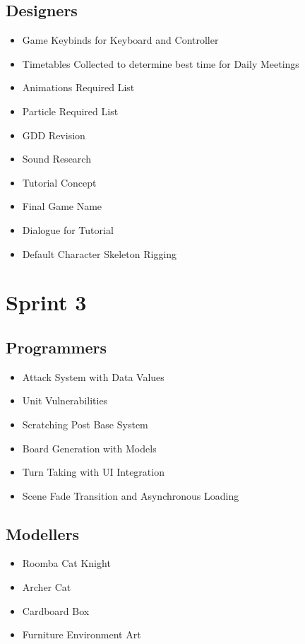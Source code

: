 \documentclass{article}
\begin{document}
\subsection{Designers}
\begin{itemize}
    \item Game Keybinds for Keyboard and Controller
    \item Timetables Collected to determine best time for Daily Meetings
    \item Animations Required List
    \item Particle Required List
    \item GDD Revision
    \item Sound Research
    \item Tutorial Concept
\end{itemize}

\begin{itemize}
    \item Final Game Name
    \item Dialogue for Tutorial
\end{itemize}

\begin{itemize}
    \item Default Character Skeleton Rigging
\end{itemize}

\newpage
\section{Sprint 3}
\subsection{Programmers}
\begin{itemize}
    \item Attack System with Data Values
    \item Unit Vulnerabilities
    \item Scratching Post Base System
    \item Board Generation with Models
    \item Turn Taking with UI Integration
    \item Scene Fade Transition and Asynchronous Loading
\end{itemize}

\subsection{Modellers}
\begin{itemize}
    \item Roomba Cat Knight
    \item Archer Cat
    \item Cardboard Box
    \item Furniture Environment Art
\end{itemize}
\end{document}
